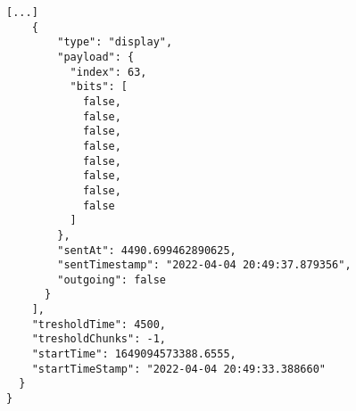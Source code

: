 \begin{lstlisting}[caption={\lstinline!minosrequest! programmaparatūras ziņu ieraksts JSON formātā},label={lst:buttonleds},captionpos=b]
    [...]
    {
        "type": "display",
        "payload": {
          "index": 63,
          "bits": [
            false,
            false,
            false,
            false,
            false,
            false,
            false,
            false
          ]
        },
        "sentAt": 4490.699462890625,
        "sentTimestamp": "2022-04-04 20:49:37.879356",
        "outgoing": false
      }
    ],
    "tresholdTime": 4500,
    "tresholdChunks": -1,
    "startTime": 1649094573388.6555,
    "startTimeStamp": "2022-04-04 20:49:33.388660"
  }
}
\end{lstlisting}
